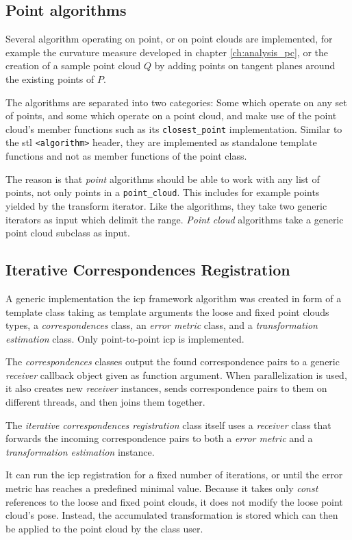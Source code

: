 \subsection{Point algorithms}
Several algorithm operating on point, or on point clouds are implemented, for example the curvature measure developed in chapter \ref{ch:analysis_pc}, or the creation of a sample point cloud $Q$ by adding points on tangent planes around the existing points of $P$.

The algorithms are separated into two categories: Some which operate on any set of points, and some which operate on a point cloud, and make use of the point cloud's member functions such as its \verb&closest_point& implementation. Similar to the \gls{stl} \verb&<algorithm>& header, they are implemented as standalone template functions and not as member functions of the point class. 

The reason is that \emph{point} algorithms should be able to work with any list of points, not only points in a \verb&point_cloud&. This includes for example points yielded by the transform iterator. Like the  algorithms, they take two generic iterators as input which delimit the range. \emph{Point cloud} algorithms take a generic point cloud subclass as input.


\subsection{Iterative Correspondences Registration}
A generic implementation the \gls{icp} framework algorithm was created in form of a template class taking as template arguments the loose and fixed point clouds types, a \emph{correspondences} class, an \emph{error metric} class, and a \emph{transformation estimation} class. Only point-to-point \gls{icp} is implemented.

The \emph{correspondences} classes output the found correspondence pairs to a generic \emph{receiver} callback object given as function argument. When parallelization is used, it also creates new \emph{receiver} instances, sends correspondence pairs to them on different threads, and then joins them together.

The \emph{iterative correspondences registration} class itself uses a \emph{receiver} class that forwards the incoming correspondence pairs to both a \emph{error metric} and a \emph{transformation estimation} instance.

It can run the \gls{icp} registration for a fixed number of iterations, or until the error metric has reaches a predefined minimal value. Because it takes only \emph{const} references to the loose and fixed point clouds, it does not modify the loose point cloud's pose. Instead, the accumulated transformation is stored which can then be applied to the point cloud by the class user.

